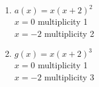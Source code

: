 \documentclass{ximera}
\begin{document}
\begin{enumerate}
\setcounter{enumi}{\value{HW}}

\item $a(x) = x(x + 2)^{2}$\\
$x = 0$ multiplicity 1\\
$x = -2$ multiplicity 2\\

%

\vfill


\item $g(x) = x(x + 2)^{3}$\\
$x = 0$ multiplicity 1\\
$x = -2$ multiplicity 3\\

%


\setcounter{HW}{\value{enumi}}
\end{enumerate}
\end{document}

